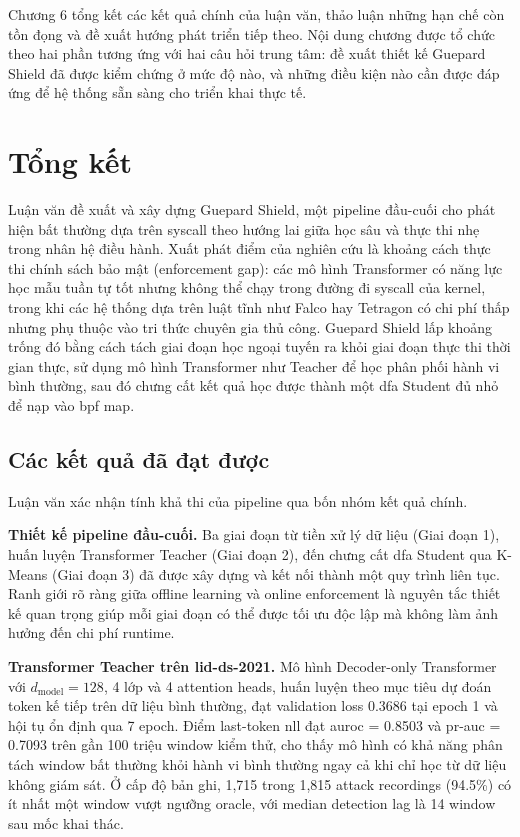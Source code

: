 \documentclass[../main.tex]{subfiles}
\begin{document}
Chương 6 tổng kết các kết quả chính của luận văn, thảo luận những hạn chế còn tồn đọng
và đề xuất hướng phát triển tiếp theo. Nội dung chương được tổ chức theo hai phần tương
ứng với hai câu hỏi trung tâm: đề xuất thiết kế Guepard Shield đã được kiểm chứng ở mức
độ nào, và những điều kiện nào cần được đáp ứng để hệ thống sẵn sàng cho triển khai thực
tế.

\section{Tổng kết}
\label{sec:conclusions_summary}

Luận văn đề xuất và xây dựng Guepard Shield, một pipeline đầu-cuối cho phát hiện bất
thường dựa trên \gls{syscall} theo hướng lai giữa học sâu và thực thi nhẹ trong nhân hệ điều
hành. Xuất phát điểm của nghiên cứu là khoảng cách thực thi chính sách bảo mật (enforcement
gap): các mô hình Transformer có năng lực học mẫu tuần tự tốt nhưng không thể chạy trong
đường đi \gls{syscall} của kernel, trong khi các hệ thống dựa trên luật tĩnh như Falco hay
Tetragon có chi phí thấp nhưng phụ thuộc vào tri thức chuyên gia thủ công. Guepard Shield
lấp khoảng trống đó bằng cách tách giai đoạn học ngoại tuyến ra khỏi giai đoạn thực thi
thời gian thực, sử dụng mô hình Transformer như Teacher để học phân phối hành vi bình
thường, sau đó chưng cất kết quả học được thành một \gls{dfa} Student đủ nhỏ để nạp vào \gls{bpf} map.

\subsection{Các kết quả đã đạt được}

Luận văn xác nhận tính khả thi của pipeline qua bốn nhóm kết quả chính.

\textbf{Thiết kế pipeline đầu-cuối.} Ba giai đoạn từ tiền xử lý dữ liệu (Giai đoạn 1),
huấn luyện Transformer Teacher (Giai đoạn 2), đến chưng cất \gls{dfa} Student qua K-Means (Giai
đoạn 3) đã được xây dựng và kết nối thành một quy trình liên tục. Ranh giới rõ ràng giữa
offline learning và online enforcement là nguyên tắc thiết kế quan trọng giúp mỗi giai đoạn
có thể được tối ưu độc lập mà không làm ảnh hưởng đến chi phí runtime.

\textbf{Transformer Teacher trên \gls{lid-ds}-2021.} Mô hình Decoder-only Transformer với
$d_{\text{model}} = 128$, 4 lớp và 4 attention heads, huấn luyện theo mục tiêu dự đoán
token kế tiếp trên dữ liệu bình thường, đạt validation loss 0.3686 tại epoch 1 và hội tụ
ổn định qua 7 epoch. Điểm last-token \gls{nll} đạt \gls{auroc} = 0.8503 và \gls{pr-auc} = 0.7093 trên gần
100 triệu window kiểm thử, cho thấy mô hình có khả năng phân tách window bất thường khỏi
hành vi bình thường ngay cả khi chỉ học từ dữ liệu không giám sát. Ở cấp độ bản ghi, 1,715
trong 1,815 attack recordings (94.5\%) có ít nhất một window vượt ngưỡng oracle, với
median detection lag là 14 window sau mốc khai thác.
\end{document}

